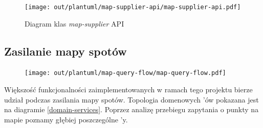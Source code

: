 \begin{figure}[H]
	\begin{center}
		\texttt{[image: out/plantuml/map-supplier-api/map-supplier-api.pdf]}
	\end{center}
    \caption{Diagram klas \emph{map-supplier} API}
    \label{ms-api}
\end{figure}

\newpage

\subsection{Zasilanie mapy spotów}

\begin{figure}[H]
	\begin{center}
		\texttt{[image: out/plantuml/map-query-flow/map-query-flow.pdf]}
	\end{center}
\end{figure}

Większość funkcjonalności zaimplementowanych w ramach tego projektu bierze udział podczas zasilania mapy spotów.
Topologia domenowych 'ów pokazana jest na diagramie \ref{domain-services}. 
Poprzez analizę przebiegu zapytania o punkty na mapie poznamy głębiej poszczególne 'y.

